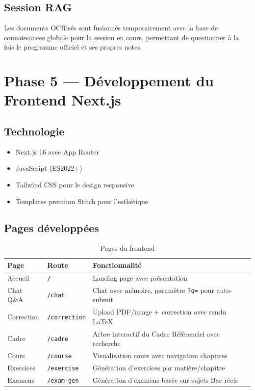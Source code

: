 \documentclass[12pt,a4paper]{report}
\begin{document}
\subsection{Session RAG}
Les documents OCRisés sont fusionnés temporairement avec la base de connaissances globale pour la session en cours, permettant de questionner à la fois le programme officiel et ses propres notes.

\section{Phase 5 — Développement du Frontend Next.js}

\subsection{Technologie}
\begin{itemize}
    \item Next.js 16 avec App Router
    \item JavaScript (ES2022+)
    \item Tailwind CSS pour le design responsive
    \item Templates premium Stitch pour l'esthétique
\end{itemize}

\subsection{Pages développées}
\begin{table}[h!]
    \centering
    \begin{tabular}{p{3cm} p{5cm} p{6cm}}
        \toprule
        \textbf{Page} & \textbf{Route} & \textbf{Fonctionnalité} \\
        \midrule
        Accueil & \texttt{/} & Landing page avec présentation \\
        Chat Q\&A & \texttt{/chat} & Chat avec mémoire, paramètre \texttt{?q=} pour auto-submit \\
        Correction & \texttt{/correction} & Upload PDF/image + correction avec rendu LaTeX \\
        Cadre & \texttt{/cadre} & Arbre interactif du Cadre Référenciel avec recherche \\
        Cours & \texttt{/course} & Visualisation cours avec navigation chapitres \\
        Exercices & \texttt{/exercise} & Génération d'exercices par matière/chapitre \\
        Examens & \texttt{/exam-gen} & Génération d'examens basée sur sujets Bac réels \\
        \bottomrule
    \end{tabular}
    \caption{Pages du frontend}
\end{table}
\end{document}

